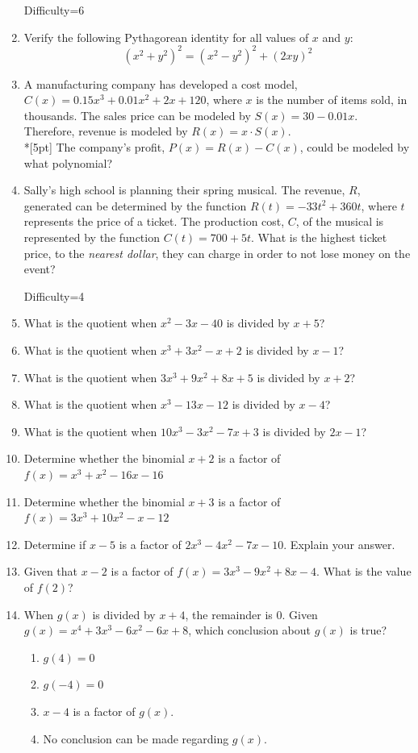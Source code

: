 \documentclass[12pt, oneside]{article}
\begin{document}
\begin{enumerate}
Difficulty=6
\item Verify the following Pythagorean identity for all values of $x$ and $y$: \[(x^2 + y^2)^2= (x^2- y^2)^2+ (2xy)^2\] %

\item A manufacturing company has developed a cost model, $C(x)=0.15x^3+0.01x^2+2x+120$, where $x$ is the number of items sold, in thousands. The sales price can be modeled by $S(x)=30-0.01x$. Therefore, revenue is modeled by $R(x)=x \cdot S(x)$.\\*[5pt]
The company’s profit, $P(x)=R(x)-C(x)$, could be modeled by what polynomial?  %

\item Sally’s high school is planning their spring musical. The revenue, $R$, generated can be determined by the function $R(t)=-33t^2+360t$, where $t$ represents the price of a ticket. The production cost, $C$, of the musical is represented by the function $C(t)=700+5t$. What is the highest ticket price, to the \emph{nearest dollar}, they can charge in order to not lose money on the event? %

Difficulty=4
\item What is the quotient when $x^2-3x-40$ is divided by $x + 5$?
\item What is the quotient when $x^3+3x^2-x+2$ is divided by $x - 1$?
\item What is the quotient when $3x^3+9x^2+8x+5$ is divided by $x+2$?
\item What is the quotient when $x^3-13x-12$ is divided by $x - 4$?
\item What is the quotient when $10x^3-3x^2-7x+3$ is divided by $2x - 1$? %

\item Determine whether the binomial $x+2$ is a factor of $f(x)=x^3+x^2-16x-16$
\item Determine whether the binomial $x+3$ is a factor of $f(x)=3x^3+10x^2-x-12$

\item Determine if $x-5$ is a factor of $2x^3-4x^2-7x-10$. Explain your answer. %

\item Given that $x-2$ is a factor of $f(x)=3x^3-9x^2+8x-4$. What is the value of $f(2)$?

\item When $g(x)$ is divided by $x+4$, the remainder is 0. Given $g(x)= x^4+3x^3-6x^2-6x+8$, which conclusion about $g(x)$ is true?
\begin{enumerate}
    \item $g(4)=0$
    \item $g(-4)=0$
    \item $x-4$ is a factor of $g(x)$.
    \item No conclusion can be made regarding $g(x)$.
\end{enumerate} %


\end{enumerate}
\end{document}

